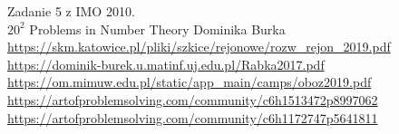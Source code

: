 
 Zadanie 5 z IMO 2010. \\
 $20^2$ Problems in Number Theory Dominika Burka \\
 \url{https://skm.katowice.pl/pliki/szkice/rejonowe/rozw_rejon_2019.pdf} \\
 \url{https://dominik-burek.u.matinf.uj.edu.pl/Rabka2017.pdf} \\
 \url{https://om.mimuw.edu.pl/static/app_main/camps/oboz2019.pdf} \\
 \url{https://artofproblemsolving.com/community/c6h1513472p8997062} \\
 \url{https://artofproblemsolving.com/community/c6h1172747p5641811} \\